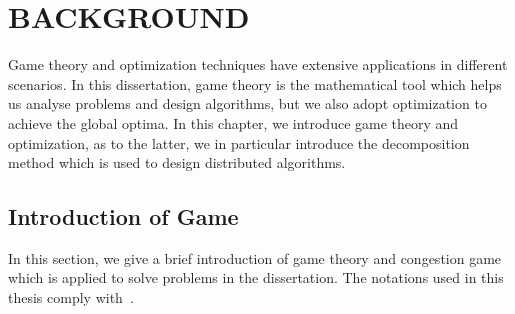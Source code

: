 \chapter{BACKGROUND}
\label{background}
Game theory and optimization techniques have extensive applications in different scenarios.
In this dissertation, game theory is the mathematical tool which helps us analyse problems and design algorithms, but we also adopt optimization to achieve the global optima.
In this chapter, we introduce game theory and optimization, as to the latter, we in particular introduce the decomposition method which is used to design distributed algorithms.







 

\section{Introduction of Game}
In this section, we give a brief introduction of game theory and congestion game which is applied to solve problems in the dissertation.
The notations used in this thesis comply with~\cite{agt_book}.




